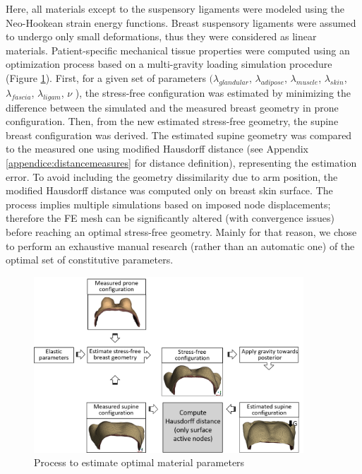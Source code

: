 Here, all materials except to the suspensory ligaments were modeled using the Neo-Hookean strain energy functions. Breast suspensory ligaments were assumed to undergo only small deformations, thus they were considered as linear materials.  Patient-specific mechanical tissue properties were computed using an optimization process based on a multi-gravity loading simulation procedure (Figure \ref{fig:optimizationalgo}). First, for a given set of parameters $(\lambda_{glandular}$, $\lambda_{adipose}$, $ \lambda_{muscle}$,  $\lambda_{skin}$, $\lambda_{fascia}$, $\lambda_{ligam}$, $\nu$ ), the stress-free configuration was estimated by minimizing the difference between the simulated and the measured breast geometry in prone configuration. Then, from the new estimated stress-free geometry, the supine breast configuration was derived. The estimated supine geometry was compared to the measured one using modified Hausdorff distance (see Appendix \ref{appendice:distancemeasures} for distance definition), representing the estimation error.  To avoid including the geometry dissimilarity due to arm position, the modified Hausdorff distance was computed only on breast skin surface.  
The process implies multiple simulations based on imposed node displacements; therefore the FE mesh can be significantly altered (with convergence issues) before reaching an optimal stress-free geometry. Mainly for that reason, we chose to perform an exhaustive manual research (rather than an automatic one) of the optimal set of constitutive parameters. 


\begin{figure}[!h]
\centering
\includegraphics[width=0.9\textwidth,keepaspectratio]{figures/optimizationMaterialParameters.png} 
\caption{Process to estimate optimal material parameters}\label{fig:optimizationalgo}
\end{figure}
 
